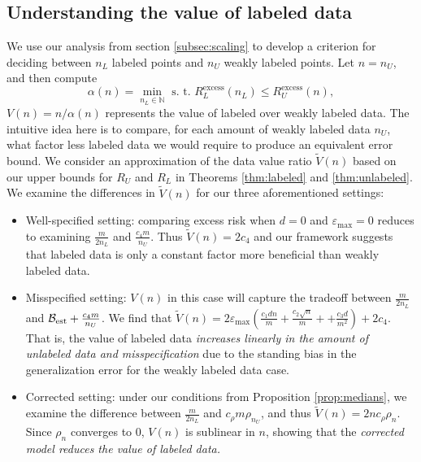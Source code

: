 \subsection{Understanding the value of labeled data}
We use our analysis from section \ref{subsec:scaling} to develop a criterion for deciding between $n_L$ labeled points and $n_U$ weakly labeled points. Let $n = n_U$, and then compute
\[\alpha(n) = \min_{n_L \in \mathbb{N}} \text{ s. t. } R_L^{\mathrm{excess}}(n_L) \le R_U^{\mathrm{excess}}(n),\]
 
$V(n) = {n}/\alpha(n)$
represents the value of labeled over weakly labeled data. The intuitive idea here is to compare, for each amount of weakly labeled data $n_U$, what factor less labeled data we would require to produce an equivalent error bound. We consider an approximation of the data value ratio $\widetilde{V}(n)$ based on our upper bounds for $R_U$ and $R_L$ in Theorems \ref{thm:labeled} and \ref{thm:unlabeled}. We examine the differences in $\widetilde{V}(n)$ for our three aforementioned settings:
\begin{itemize}
    \item Well-specified setting: comparing excess risk when $d = 0$ and $\varepsilon_{\max} = 0$ reduces to examining $\frac{m}{2n_L}$ and $\frac{c_4 m}{n_U}$. Thus $\widetilde{V}(n) = 2c_4$ and our framework suggests that labeled data is only a constant factor more beneficial than weakly labeled data.
    \item Misspecified setting: $V(n)$ in this case will capture the tradeoff between $\frac{m}{2n_L}$ and $\mathcal{B}_{\mathrm{est}} + \frac{c_4 m }{n_U}$. We find that $\widetilde{V}(n) = 2 \varepsilon_{\max} \left(\frac{c_1 dn}{m} + \frac{c_2 \sqrt{n}}{m} + +\frac{c_3 d}{m^2} \right) + 2 c_4$. That is, the value of labeled data \textit{increases linearly in the amount of unlabeled data and misspecification} due to the standing bias in the generalization error for the weakly labeled data case.  
    \item Corrected setting: under our conditions from Proposition \ref{prop:medians}, we examine the difference between $\frac{m}{2n_L}$ and $ c_\rho m \rho_{n_
    U}$, and thus $\widetilde{V}(n) = 2nc_{\rho} \rho_n$. Since $\rho_n$ converges to $0$, $V(n)$ is sublinear in $n$, showing that the \textit{corrected model reduces the value of labeled data.}
\end{itemize}

